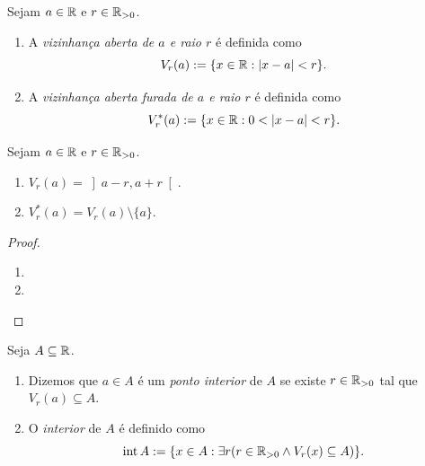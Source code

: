 \begin{definition}
    Sejam $a \in \mathbb{R}$ e $r \in \mathbb{R}_{>0}$.
        \begin{enumerate}[leftmargin=*, align=left, label=\textbf{(\alph*)}]
            \item A \emph{vizinhança aberta de $a$ e raio $r$} é definida como
                \[
                    V_r(a) := \{x \in \mathbb{R} : |x-a|<r \}.
                \]
            \item A \emph{vizinhança aberta furada de $a$ e raio $r$} é definida como
                \[
                    V^*_r(a) := \{x \in \R : 0<|x-a|<r \}.
                \]
        \end{enumerate}
\end{definition}

\begin{corollary}
    Sejam $a \in \mathbb{R}$ e $r \in \mathbb{R}_{>0}$.
        \begin{enumerate}[leftmargin=*, align=left, label=\textbf{(\alph*)}]
            \item $V_r(a) = \left]a-r, a+r \right[$.
            \item $V^*_r(a) = V_r(a) \setminus \{a\}$.
        \end{enumerate}
\end{corollary}

\begin{proof}
    \leavevmode
        \begin{enumerate}[leftmargin=*, align=left, label=\textbf{(\alph*)}]
            \item \blackproof
            \item \blackproof
        \end{enumerate}
\end{proof}

\begin{definition}
    Seja $A \subseteq \mathbb{R}$.
        \begin{enumerate}[leftmargin=*, align=left, label=\textbf{(\alph*)}]
            \item Dizemos que $a \in A$ é um \emph{ponto interior} de $A$ se existe $r \in \mathbb{R}_{>0}$ tal que $V_r(a) \subseteq A$.
            \item O \emph{interior} de $A$ é definido como
                \[
                    \operatorname{int}{A} := \{ x \in A : \exists r (r \in \mathbb{R}_{>0} \land V_r(x) \subseteq A ) \}.
                \]
        \end{enumerate}
\end{definition}


